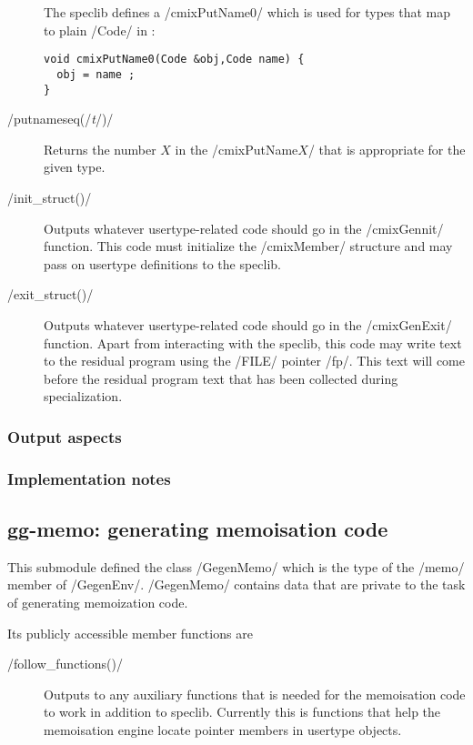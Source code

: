 \begin{docpart}
\begin{description}
	The speclib defines a /cmixPutName0/ which is used for types
	that map to plain /Code/ in \Pgen:
\begin{verbatim}
void cmixPutName0(Code &obj,Code name) {
  obj = name ;
}
\end{verbatim}
\item[/putnameseq(/\textit{\mdseries t}/)/]
	Returns the number $X$ in the /cmixPutName$X$/ that is
	appropriate for the given type.
\item[/init_struct()/]
	Outputs whatever usertype-related code should go in the
	/cmixGennit/ function. This code must initialize the
	/cmixMember/ structure and may pass on usertype definitions
	to the speclib.
\item[/exit_struct()/]
	Outputs whatever usertype-related code should go in the
	/cmixGenExit/ function. Apart from interacting with the
	speclib, this code may write text to the residual program
	using the /FILE/ pointer /fp/. This text will come before
	the residual program text that has been collected during
	specialization.
\end{description}

\subsubsection{Output aspects}

\subsubsection{Implementation notes}

\subsection{gg-memo: generating memoisation code}

This submodule defined the class /GegenMemo/ which is the type of
the /memo/ member of /GegenEnv/. /GegenMemo/ contains data that
are private to the task of generating memoization code.

Its publicly accessible member functions are
\begin{description}
\item[/follow_functions()/]
	Outputs to \Pgen any auxiliary functions that is needed for
	the memoisation code to work in addition to speclib. Currently
	this is functions that help the memoisation engine locate
	pointer members in usertype objects.


\end{description}
\end{docpart}
